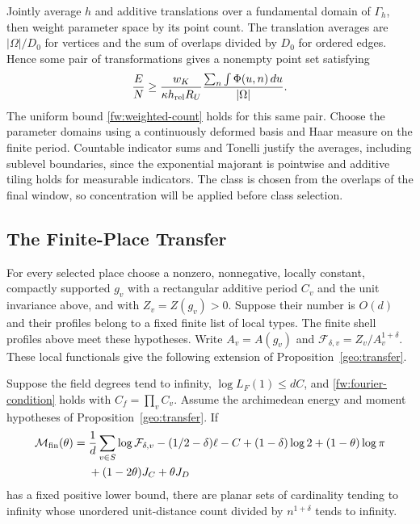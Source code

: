 Jointly average $h$ and additive translations over a fundamental domain
of $\Gamma_h$, then weight parameter space by its point count. The
translation averages are $|\Omega|/D_0$ for vertices and the sum of
overlaps divided by $D_0$ for ordered edges. Hence some pair of
transformations gives a nonempty point set satisfying
\begin{equation}\label{fw:joint-average}
 \frac EN\ge
 \frac{w_K}{\kappa h_{\rm rel}R_U}
 \frac{\sum_n\int\Phi(u,n)\,du}{|\Omega|}.
\end{equation}
The uniform bound \eqref{fw:weighted-count} holds for this same pair.
Choose the parameter domains using a continuously deformed basis and
Haar measure on the finite period. Countable indicator sums and Tonelli
justify the averages, including sublevel boundaries, since the
exponential majorant is pointwise and additive tiling holds for
measurable indicators. The class is chosen from the overlaps of the
final window, so concentration will be applied before class selection.

\subsection{The Finite-Place Transfer}

For every selected place choose a nonzero, nonnegative, locally constant,
compactly supported $g_v$ with a rectangular additive period $C_v$ and
the unit invariance above, and with $Z_v=Z(g_v)>0$. Suppose their number
is $O(d)$ and their profiles belong to a fixed finite list of local types.
The finite shell profiles above meet these hypotheses. Write
$A_v=A(g_v)$ and $\mathcal F_{\delta,v}=Z_v/A_v^{1+\delta}$. These local
functionals give the following extension of Proposition~\ref{geo:transfer}.

\begin{proposition}\label{fw:transfer}
Suppose the field degrees tend to infinity, $\log L_F(1)\le dC$, and
\eqref{fw:fourier-condition} holds with $C_f=\prod_v C_v$.
Assume the archimedean energy and moment hypotheses of
Proposition~\ref{geo:transfer}. If
\begin{equation}\label{fw:margin}
 \begin{split}
 \mathcal M_{\rm fin}(\theta)={}&
 \frac1d\sum_{v\in S}\log\mathcal F_{\delta,v}
 -(1/2-\delta)\ell-C+(1-\delta)\log2+(1-\theta)\log\pi\\
 &+(1-2\theta)J_C+\theta J_D
 \end{split}
\end{equation}
has a fixed positive lower bound, there are planar sets of cardinality
tending to infinity whose unordered unit-distance count divided by
$n^{1+\delta}$ tends to infinity.
\end{proposition}

